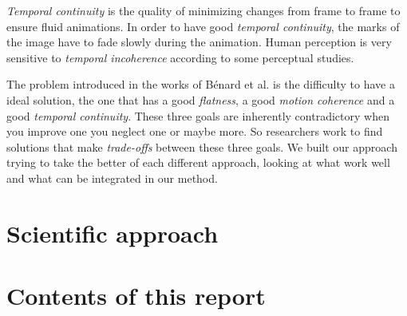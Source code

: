 \textit{Temporal continuity} is the quality of minimizing changes from frame to frame to ensure fluid animations. In order to have good \textit{temporal continuity}, the marks of the image have to fade slowly during the animation. Human perception is very sensitive to \textit{temporal incoherence} according to some perceptual studies\cite{percept_studies, Schwarz_2009}. \newline


The problem introduced in the works of Bénard et al.\cite{benard_state---art_2011} is the difficulty to have a ideal solution, the one that has a good \textit{flatness}, a good \textit{motion coherence} and a good \textit{temporal continuity}. These three goals are inherently contradictory when you improve one you neglect one or maybe more. So researchers work to find solutions that make \textit{trade-offs} between these three goals. We built our approach trying to take the better of each different approach, looking at what work well and what can be integrated in our method.

\section{Scientific approach}

\section{Contents of this report}

